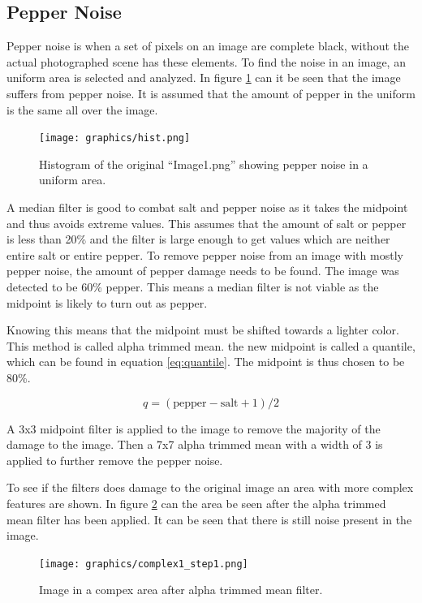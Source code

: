 \subsection{Pepper Noise}\label{image_1}
Pepper noise is when a set of pixels on an image are complete black, without the actual photographed scene has these elements.
To find the noise in an image, an uniform area is selected and analyzed.
In figure \ref{fig:hist_pepper} can it be seen that the image suffers from pepper noise.
It is assumed that the amount of pepper in the uniform is the same all over the image.

\begin{figure}[H]
\texttt{[image: graphics/hist.png]}
\caption{Histogram of the original ``Image1.png'' showing pepper noise in a uniform area.}
\label{fig:hist_pepper}
\end{figure}

A median filter is good to combat salt and pepper noise as it takes the midpoint and thus avoids extreme values.
This assumes that the amount of salt or pepper is less than 20\% and the filter is large enough to get values which are neither entire salt or entire pepper.
To remove pepper noise from an image with mostly pepper noise, the amount of pepper damage needs to be found.
The image was detected to be 60\% pepper.
This means a median filter is not viable as the midpoint is likely to turn out as pepper.

Knowing this means that the midpoint must be shifted towards a lighter color.
This method is called alpha trimmed mean.
the new midpoint is called a quantile, which can be found in equation \ref{eq:quantile}.
The midpoint is thus chosen to be 80\%. 

\begin{equation}
 q = (\text{pepper}-\text{salt}+1)/2 \label{eq:quantile}
\end{equation}

A 3x3 midpoint filter is applied to the image to remove the majority of the damage to the image.
Then a 7x7 alpha trimmed mean with a width of 3 is applied to further remove the pepper noise.

To see if the filters does damage to the original image an area with more complex features are shown.
In figure \ref{fig:complex1_after_alpha} can the area be seen after the alpha trimmed mean filter has been applied.
It can be seen that there is still noise present in the image.

\begin{figure}[H]
\texttt{[image: graphics/complex1\_step1.png]}
\caption{Image in a compex area after alpha trimmed mean filter.}
\label{fig:complex1_after_alpha}
\end{figure}


